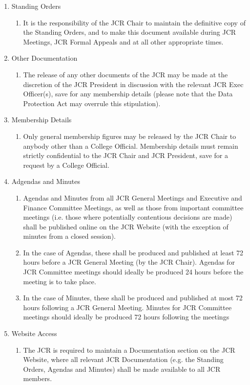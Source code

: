 \begin{enumerate}
    \item Standing Orders
    \begin{enumerate}
        \item It is the responsibility of the JCR Chair to maintain the definitive copy of the Standing Orders, and to make this document available during JCR Meetings, JCR Formal Appeals and at all other appropriate times.
    \end{enumerate}
    \item Other Documentation
    \begin{enumerate}
        \item The release of any other documents of the JCR may be made at the discretion of the JCR President in discussion with the relevant JCR Exec Officer(s), save for any membership details (please note that the Data Protection Act may overrule this stipulation).
    \end{enumerate}
    \item Membership Details
    \begin{enumerate}
        \item Only general membership figures may be released by the JCR Chair to anybody other than a College Official. Membership details must remain strictly confidential to the JCR Chair and JCR President, save for a request by a College Official.
    \end{enumerate}
    \item Adgendas and Minutes
    \begin{enumerate}
        \item Agendas and Minutes from all JCR General Meetings and Executive and Finance Committee Meetings, as well as those from important committee meetings (i.e. those where potentially contentious decisions are made) shall be published online on the JCR Website (with the exception of minutes from a closed session).
        \item In the case of Agendas, these shall be produced and published at least 72 hours before a JCR General Meeting (by the JCR Chair). Agendas for JCR Committee meetings should ideally be produced 24 hours before the meeting is to take place.
        \item In the case of Minutes, these shall be produced and published at most 72 hours following a JCR General Meeting. Minutes for JCR Committee meetings should ideally be produced 72 hours following the meetings
    \end{enumerate}
    \item Website Access
    \begin{enumerate}
        \item The JCR is required to maintain a Documentation section on the JCR Website, where all relevant JCR Documentation (e.g. the Standing Orders, Agendas and Minutes) shall be made available to all JCR members.
    \end{enumerate}
\end{enumerate}


